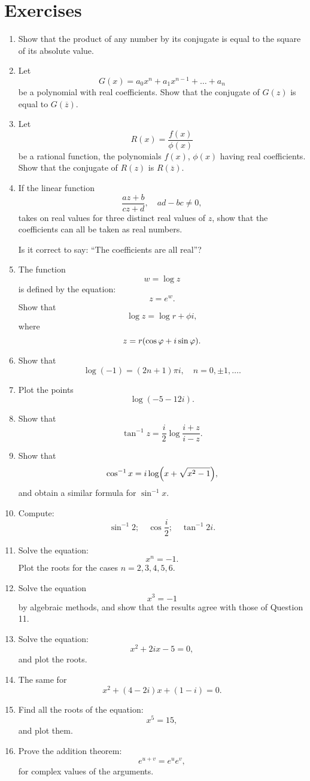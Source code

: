 \documentclass[letter,oneside]{memoir}
\begin{document}
\section{Exercises}
\begin{enumerate}
\item Show that the product of any number by its conjugate is equal to the square of its absolute value.
\item Let
	\[
		G(x)=a_0x^n+a_1x^{n-1}+\dots +a_n
	\] be a polynomial with real coefficients. Show that the conjugate of $G(z)$ is equal to $G(\overline{z})$. 
\item Let
	\[
		R(x)=\frac{f(x)}{\phi(x)} 
	\] be a rational function, the polynomials $f(x)$, $\phi (x)$ having real coefficients. Show that the conjugate of $R(z)$ is $R(\overline{z})$.
\item If the linear function
	\[
	\frac{az+b}{cz+d} ,\quad ad-bc\neq 0
	,\] takes on real values for three distinct real values of $z$, show that the coefficients can all be taken as real numbers. 

	Is it correct to say: ``The coefficients are all real''?
\item The function
	\[
	w=\log z
	\] is defined by the equation:
	\[
	z=e^{w}
	.\] Show that
	\[
	\log z=\log r+\phi i
,\] where 
\[
	z=r\pbr*{\cos \phi +i\sin \phi }
.\]
\item Show that
	\[
		\log (-1)=(2n+1)\pi i, \quad n=0, \pm 1, \dots 
	.\] 
\item Plot the points
	\[
		\log (-5-12i)
	.\] 
\item Show that
	\[
	\tan ^{-1}z=\frac{i}{2}\log \frac{i+z}{i-z} 
	.\] 
\item Show that
	\[
		\cos ^{-1}x=i\log \pbr*{x+\sqrt{x^2-1} } 
	,\] and obtain a similar formula for $\sin ^{-1}x$.
\item Compute:
	\[
	\sin ^{-1}2; \quad \cos \frac{i}{2}; \quad \tan ^{-1}2i
	.\] 
\item Solve the equation:
	\[
	x^n=-1
	.\] Plot the roots for the cases $n=2,3,4,5,6$.
\item Solve the equation
	\[
	x^3=-1
	\] by algebraic methods, and show that the results agree with those of Question 11.
\item Solve the equation:
	\[
	x^2+2ix-5=0
	,\] and plot the roots.
\item The same for
	\[
		x^2+(4-2i)x+(1-i)=0
	.\] 
\item Find all the roots of the equation:
	\[
	x^5=15
	,\] and plot them.
\item Prove the addition theorem:
	\[
	e^{u+v}=e^{u}e^{v}
	,\] for complex values of the arguments.


\end{enumerate}
\end{document}
